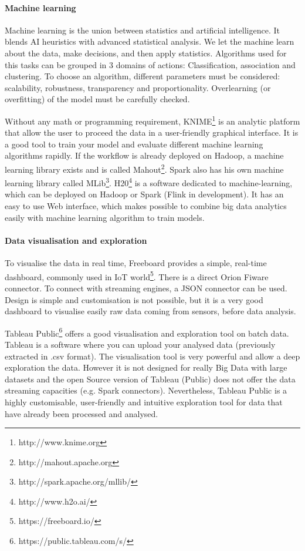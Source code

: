 \paragraph{Machine learning}

Machine learning is the union between statistics and artificial intelligence.
It blends AI heuristics with advanced statistical analysis.
We let the machine learn about the data, make decisions, and then apply statistics.
Algorithms used for this tasks can be grouped in 3 domains of actions: Classification, association and clustering.
To choose an algorithm, different parameters must be considered: scalability, robustness, transparency and proportionality.
Overlearning (or overfitting) of the model must be carefully checked.

Without any math or programming requirement, KNIME\footnote{http://www.knime.org} is an analytic platform that allow the user to proceed the data in a user-friendly graphical interface.
It is a good tool to train your model and evaluate different machine learning algorithms rapidly.
If the workflow is already deployed on Hadoop, a machine learning library exists and is called Mahout\footnote{http://mahout.apache.org}.
Spark also has his own machine learning library called MLib\footnote{http://spark.apache.org/mllib/}.
H20\footnote{http://www.h2o.ai/} is a software dedicated to machine-learning, which can be deployed on Hadoop or Spark (Flink in development).
It has an easy to use Web interface, which makes possible to combine big data analytics easily with machine learning algorithm to train models.

\paragraph{Data visualisation and exploration}

To visualise the data in real time, Freeboard provides a simple, real-time dashboard, commonly used in IoT world\footnote{https://freeboard.io/}.
There is a direct Orion Fiware connector.
To connect with streaming engines, a JSON connector can be used.
Design is simple and customisation is not possible, but it is a very good dashboard to visualise easily raw data coming from sensors, before data analysis.

Tableau Public\footnote{https://public.tableau.com/s/} offers a good visualisation and exploration tool on batch data.
Tableau is a software where you can upload your analysed data (previously extracted in .csv format).
The visualisation tool is very powerful and allow a deep exploration the data.
However it is not designed for really Big Data with large datasets and the open Source version of Tableau (Public) does not offer the data streaming capacities (e.g. Spark connectors).
Nevertheless, Tableau Public is a highly customisable, user-friendly and intuitive exploration tool for data that have already been processed and analysed.

